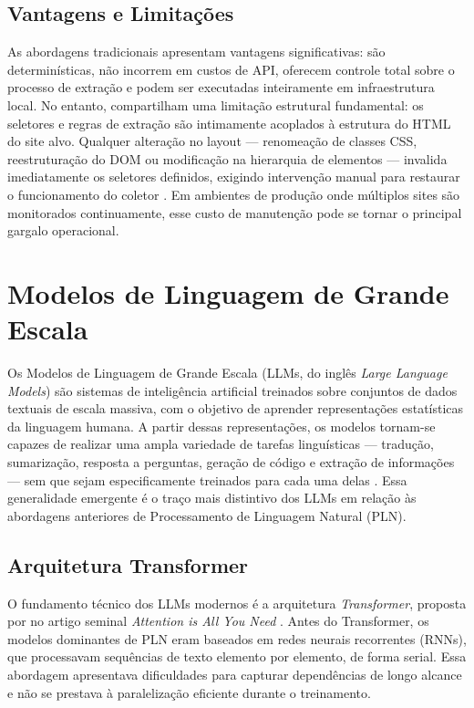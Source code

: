 \documentclass[tcc,capa]{texifsul}
\begin{document}
\subsection*{Vantagens e Limitações}

As abordagens tradicionais apresentam vantagens significativas: são determinísticas, não incorrem em custos de API, oferecem controle total sobre o processo de extração e podem ser executadas inteiramente em infraestrutura local. No entanto, compartilham uma limitação estrutural fundamental: os seletores e regras de extração são intimamente acoplados à estrutura do HTML do site alvo. Qualquer alteração no layout — renomeação de classes CSS, reestruturação do DOM ou modificação na hierarquia de elementos — invalida imediatamente os seletores definidos, exigindo intervenção manual para restaurar o funcionamento do coletor \cite{GlezPena2014}. Em ambientes de produção onde múltiplos sites são monitorados continuamente, esse custo de manutenção pode se tornar o principal gargalo operacional.

\section{Modelos de Linguagem de Grande Escala}

Os Modelos de Linguagem de Grande Escala (LLMs, do inglês \textit{Large Language Models}) são sistemas de inteligência artificial treinados sobre conjuntos de dados textuais de escala massiva, com o objetivo de aprender representações estatísticas da linguagem humana. A partir dessas representações, os modelos tornam-se capazes de realizar uma ampla variedade de tarefas linguísticas — tradução, sumarização, resposta a perguntas, geração de código e extração de informações — sem que sejam especificamente treinados para cada uma delas \cite{Zhao2023}. Essa generalidade emergente é o traço mais distintivo dos LLMs em relação às abordagens anteriores de Processamento de Linguagem Natural (PLN).

\subsection*{Arquitetura Transformer}

O fundamento técnico dos LLMs modernos é a arquitetura \textit{Transformer}, proposta por \citeauthor{Vaswani2017} no artigo seminal \textit{Attention is All You Need} \cite{Vaswani2017}. Antes do Transformer, os modelos dominantes de PLN eram baseados em redes neurais recorrentes (RNNs), que processavam sequências de texto elemento por elemento, de forma serial. Essa abordagem apresentava dificuldades para capturar dependências de longo alcance e não se prestava à paralelização eficiente durante o treinamento.
\end{document}

